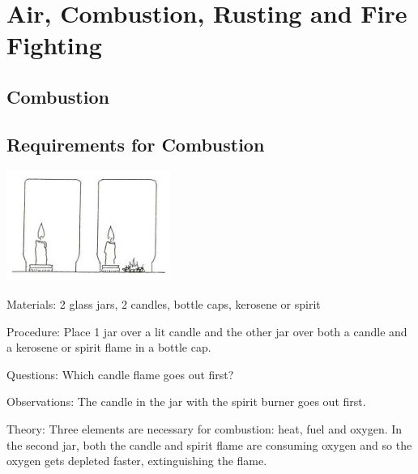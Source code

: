 \section{Air, Combustion, Rusting and Fire Fighting}

\begin{multicols}{2}


\section*{Combustion}


\subsection{Requirements for Combustion}

\begin{center}
\includegraphics[width=0.4\textwidth]{./img/source/flame-extinguisher.jpg}
\end{center}

\begin{description*}
\item[Materials:]{2 glass jars, 2 candles, bottle caps, kerosene or spirit}
\item[Procedure:]{Place 1 jar over a lit candle and the other jar over both a candle and a kerosene or spirit flame in a bottle cap.}
\item[Questions:]{Which candle flame goes out first?}
\item[Observations:]{The candle in the jar with the spirit burner goes out first.}
\item[Theory:]{Three elements are necessary for combustion: heat, fuel and oxygen. In the second jar, both the candle and spirit flame are consuming oxygen and so the oxygen gets depleted faster, extinguishing the flame.}
\end{description*}


\end{multicols}
